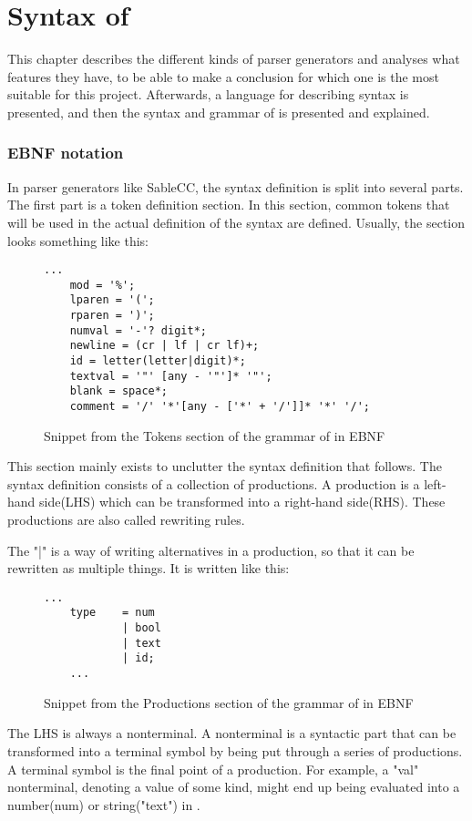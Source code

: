 \chapter{Syntax of \lang{}}
This chapter describes the different kinds of parser generators and analyses what features they have, to be able to make a conclusion for which one is the most suitable for this project. Afterwards, a language for describing syntax is presented, and then the syntax and grammar of \lang{} is presented and explained. 


\subsection{EBNF notation}
In parser generators like SableCC, the syntax definition is split into several parts. The first part is a token definition section. In this section, common tokens that will be used in the actual definition of the syntax are defined. Usually, the section looks something like this: 

\begin{figure}[H]
    \centering
    \begin{lstlisting}[]
    ...
    mod = '%';
    lparen = '(';
    rparen = ')';
    numval = '-'? digit*;
    newline = (cr | lf | cr lf)+;
    id = letter(letter|digit)*;
    textval = '"' [any - '"']* '"';
    blank = space*;
    comment = '/' '*'[any - ['*' + '/']]* '*' '/';
    \end{lstlisting}
    \caption{Snippet from the Tokens section of the grammar of \lang{} in EBNF}
    \label{fig:EBNFtoken}
\end{figure}

This section mainly exists to unclutter the syntax definition that follows. 
The syntax definition consists of a collection of productions. A production is a left-hand side(LHS) which can be transformed into a right-hand side(RHS). These productions are also called rewriting rules.

The "|" is a way of writing alternatives in a production, so that it can be rewritten as multiple things. It is written like this:

\begin{figure}[H]
    \centering
    \begin{lstlisting}[]
    ...
    type    = num
            | bool
            | text
            | id;
    ...
    \end{lstlisting}
    \caption{Snippet from the Productions section of the grammar of \lang{} in EBNF}
    \label{fig:EBNFalt}
\end{figure}


The LHS is always a nonterminal. A nonterminal is a syntactic part that can be transformed into a terminal symbol by being put through a series of productions.
A terminal symbol is the final point of a production. For example, a "val" nonterminal, denoting a value of some kind, might end up being evaluated into a number(num) or string("text") in \lang{}. 




